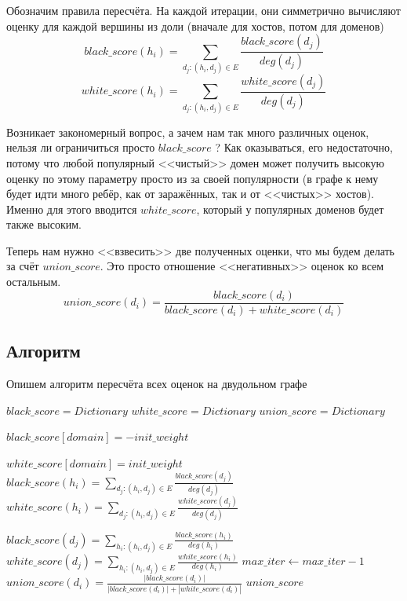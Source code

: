 \documentclass[14pt]{extreport} %
\begin{document}
Обозначим правила пересчёта. На каждой итерации, они симметрично вычисляют оценку для каждой вершины из доли (вначале для хостов, потом для доменов)
\begin{equation}
	\label{eq:dr1-black}
	black\_score(h_i) = \sum_{d_j: (h_i, d_j)\in E} \frac{black\_score(d_j)}{deg(d_j)}
\end{equation}
\begin{equation}
	\label{eq:dr1-white}
	white\_score(h_i) = \sum_{d_j: (h_i, d_j)\in E} \frac{white\_score(d_j)}{deg(d_j)}
\end{equation}
	
Возникает закономерный вопрос, а зачем нам так много различных оценок, нельзя ли ограничиться просто $black\_score$ ? Как оказываться, его недостаточно, потому что любой популярный <<чистый>> домен может получить высокую оценку по этому параметру просто из за своей популярности (в графе к нему будет идти много ребёр, как от заражённых, так и от <<чистых>> хостов). Именно для этого вводится $white\_score$, который у популярных доменов будет также высоким.
	
Теперь нам нужно <<взвесить>> две полученных оценки, что мы будем делать за счёт $union\_score$. Это просто отношение <<негативных>> оценок ко всем остальным.
\begin{equation}
	\label{eq:dr1-union}
	union\_score(d_i) = \frac{black\_score(d_i)}{black\_score(d_i) + white\_score(d_i)}
\end{equation}
	
\subsection{Алгоритм}
Опишем алгоритм пересчёта всех оценок на двудольном графе
\begin{algorithmic}
	\State $black\_score = Dictionary$
	\State $white\_score = Dictionary$
	\State $union\_score = Dictionary$
			
			
	\State $black\_score[domain] = -init\_weight$
	\EndFor
			
	\State $white\_score[domain] = init\_weight$
	\EndFor
	\State $black\_score(h_i) = \sum_{d_j: (h_i, d_j)\in E} \frac{black\_score(d_j)}{deg(d_j)}$
	\State $white\_score(h_i) = \sum_{d_j: (h_i, d_j)\in E} \frac{white\_score(d_j)}{deg(d_j)}$
	\EndFor
				
	\State $black\_score(d_j) = \sum_{h_i: (h_i, d_j)\in E} \frac{black\_score(h_i)}{deg(h_i)}$
	\State $white\_score(d_j) = \sum_{h_i: (h_i, d_j)\in E} \frac{white\_score(h_i)}{deg(h_i)}$
	\EndFor
	\State $max\_iter\gets max\_iter-1$
	\EndWhile
	\State $union\_score(d_i) = \frac{|black\_score(d_i)|}{|black\_score(d_i)| + |white\_score(d_i)|}$
	\EndFor
	\State \Return $union\_score$
	\EndFunction
\end{algorithmic}
	
\end{document}

